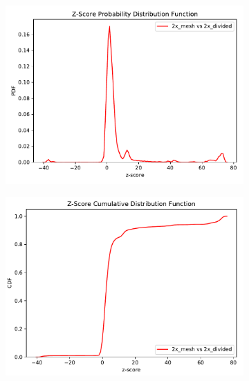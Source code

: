 \begin{figure}
	\begin{subfigure}[t]{0.5\textwidth}
		\includegraphics[width=\linewidth, trim={0cm 0cm 0cm 0.9cm},clip]{../figs/toy_p2/PDF_zscore_VPII_2xm_2xs.pdf}
		\label{fig:2dose_2x_split}
	\end{subfigure}\hfill
	\begin{subfigure}[t]{0.5\textwidth}
		\includegraphics[width=\linewidth, trim={0cm 0cm 0cm 0.8cm},clip]{../figs/toy_p2/CDF_zscore_VPII_2xm_2xs.pdf}
		\label{fig:2dose_2x_mesh}
	\end{subfigure}


\end{figure}

